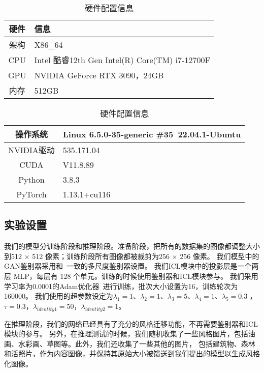 
\begin{table}[htbp]
    \caption{\label{tab:tab_hardware}硬件配置信息}
    \begin{tabularx}{\linewidth}{c|X<{\centering}}
        \hline
        硬件 & 信息 \\ \hline
        架构 & X86\_64 \\ \hline
        CPU & Intel 酷睿12th Gen Intel(R) Core(TM) i7-12700F \\ \hline
        GPU & NVIDIA GeForce RTX 3090，24GB \\ \hline
        内存 & 512GB \\ \hline
    \end{tabularx}
\end{table}
\begin{table}[htbp]
    \caption{\label{tab:tab_software}硬件配置信息}
    \begin{tabularx}{\linewidth}{c|X<{\centering}}
        \hline
        操作系统 & Linux 6.5.0-35-generic \#35~22.04.1-Ubuntu \\ \hline
        NVIDIA驱动 & 535.171.04 \\ \hline
        CUDA & V11.8.89 \\ \hline
        Python & 3.8.3 \\ \hline
        PyTorch & 1.13.1+cu116 \\ \hline
    \end{tabularx}
\end{table}
\subsection{实验设置}
我们的模型分训练阶段和推理阶段。准备阶段，把所有的数据集的图像都调整大小到512 $\times$  512 像素；训练阶段所有图像都被裁剪为256 $\times$ 256 像素。
我们模型中的GAN鉴别器采用和~\cite{wang2018high}一致的多尺度鉴别器设置。
我们ICL模块中的投影层是一个两层 MLP，每层有 128 个单元。训练的时候使用鉴别器和ICL模块参与。
我们采用学习率为0.0001的Adam优化器~\cite{diederik2014adam}进行训练，批次大小设置为16，训练轮次为160000。
我们使用的超参数设定为$\lambda_1=1$、$\lambda_2  =1$、$\lambda_3=5$、$\lambda_4=1$、$\lambda_5=0.3$ ，$\tau=0.3$，$\lambda_{identity1}=50$，$\lambda_{identity2}=1$。
\par 在推理阶段，我们的网络已经具有了充分的风格迁移功能，不再需要鉴别器和ICL模块的参与。
另外，在推理测试的时候，我们随机收集了一些风格图片，包括油画、水彩画、草图等。此外，我们还收集了一些其他的图片，
包括建筑物、森林和活照片，作为内容图像，并保持其原始大小被馈送到我们提出的模型以生成风格化图像。

